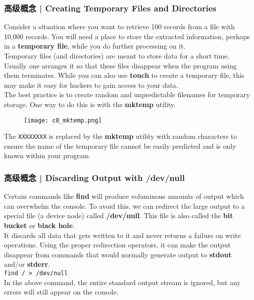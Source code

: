 \begin{frame}[fragile]
  \frametitle{高级概念 | Creating Temporary Files and Directories}
  {\footnotesize
  Consider a situation where you want to retrieve 100 records from a file with 10,000 records. You will need a place to store the extracted information, perhaps in a \textbf{temporary file}, while you do further processing on it.\\
  \vspace{0.1cm}
  Temporary files (and directories) are meant to store data for a short time. Usually one arranges it so that these files disappear when the program using them terminates. While you can also use \textbf{touch} to create a temporary file, this may make it easy for hackers to gain access to your data.\\
  \vspace{0.1cm}
  The best practice is to create random and unpredictable filenames for temporary storage. One way to do this is with the \textbf{mktemp} utility.
  \vspace{-0.3cm}
  \begin{figure}
    \centering
    \texttt{[image: c8\_mktemp.png]}
  \end{figure}
  \vspace{-0.3cm}
  The \verb|XXXXXXXX| is replaced by the \textbf{mktemp} utility with random characters to ensure the name of the temporary file cannot be easily predicted and is only known within your program.
  }
\end{frame}

\begin{frame}[fragile]
  \frametitle{高级概念 | Discarding Output with /dev/null}
  Certain commands like \textbf{find} will produce voluminous amounts of output which can overwhelm the console. To avoid this, we can redirect the large output to a special file (a device node) called \textbf{/dev/null}. This file is also called the \textbf{bit bucket} or \textbf{black hole}.\\
  \vspace{0.3cm}
  It discards all data that gets written to it and never returns a failure on write operations. Using the proper redirection operators, it can make the output disappear from commands that would normally generate output to \textbf{stdout} and/or \textbf{stderr}.\\
  \vspace{0.3cm}
  \verb|find / > /dev/null|\\
  \vspace{0.3cm}
  In the above command, the entire standard output stream is ignored, but any errors will still appear on the console.
\end{frame}

